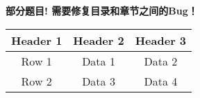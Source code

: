 \begin{table}[!htbp]
            \vspace*{20pt}
            \begin{center}
                \color{red} \LARGE \bf 部分题目! 需要修复目录和章节之间的Bug！
            \end{center}

            
            \end{table}


\begin{table}[htb]
    \centering
        \begin{tabular}{ccc}
            \toprule
                 Header 1 & Header 2 & Header 3 \\
            \midrule
                Row 1    & Data 1   & Data 2   \\
                Row 2    & Data 3   & Data 4   \\
            \bottomrule
        \end{tabular}
\end{table}